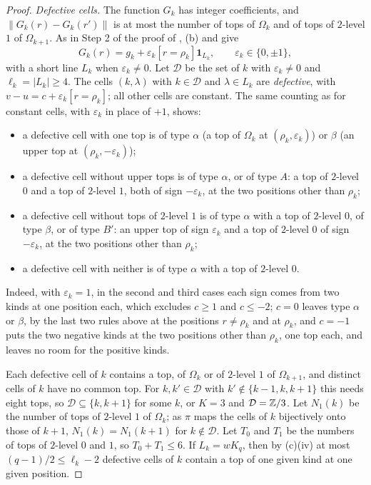 \begin{proof}
\emph{Defective cells.} The function $G_{k}$ has integer coefficients, and
$\|G_{k}(r)-G_{k}(r')\|$ is at most the number of tops of $\Omega_{k}$ and of
tops of $2$-level $1$ of $\Omega_{k+1}$. As in Step 2 of the proof of
, (b) and 
give
\[
  G_{k}(r)=g_{k}+\varepsilon_{k}[r=\rho_{k}]\mathbf 1_{L_{k}},\qquad
  \varepsilon_{k}\in\{0,\pm1\},
\]
with a short line $L_{k}$ when $\varepsilon_{k}\ne0$. Let $\mathcal D$ be the
set of $k$ with $\varepsilon_{k}\ne0$ and $\ell_{k}=|L_{k}|\ge4$. The cells
$(k,\lambda)$ with $k\in\mathcal D$ and $\lambda\in L_{k}$ are
\emph{defective}, with $v-u=c+\varepsilon_{k}[r=\rho_{k}]$; all other cells
are constant. The same counting as for constant cells, with $\varepsilon_{k}$
in place of $+1$, shows:
\begin{itemize}
\item a defective cell with one top is of type $\alpha$ (a top of $\Omega_{k}$
at $(\rho_{k},\varepsilon_{k})$) or $\beta$ (an upper top at
$(\rho_{k},-\varepsilon_{k})$);
\item a defective cell without upper tops is of type $\alpha$, or of type $A$:
a top of $2$-level $0$ and a top of $2$-level $1$, both of sign
$-\varepsilon_{k}$, at the two positions other than $\rho_{k}$;
\item a defective cell without tops of $2$-level $1$ is of type $\alpha$ with
a top of $2$-level $0$, of type $\beta$, or of type $B'$: an upper top of sign
$\varepsilon_{k}$ and a top of $2$-level $0$ of sign $-\varepsilon_{k}$, at
the two positions other than $\rho_{k}$;
\item a defective cell with neither is of type $\alpha$ with a top of
$2$-level $0$.
\end{itemize}
Indeed, with $\varepsilon_{k}=1$, in the second and third cases each sign
comes from two kinds at one position each, which excludes $c\ge1$ and
$c\le-2$; $c=0$ leaves type $\alpha$ or $\beta$, by the last two rules above
at the positions $r\ne\rho_{k}$ and at $\rho_{k}$, and $c=-1$ puts the two
negative kinds at the two positions other than $\rho_{k}$, one top each, and
leaves no room for the positive kinds.

Each defective cell of $k$ contains a top, of $\Omega_{k}$ or of $2$-level $1$
of $\Omega_{k+1}$, and distinct cells of $k$ have no common top. For
$k,k'\in\mathcal D$ with $k'\notin\{k-1,k,k+1\}$ this needs eight tops, so
$\mathcal D\subseteq\{k,k+1\}$ for some $k$, or $K=3$ and $\mathcal D=\mathbb{Z}/3$.
Let $N_{1}(k)$ be the number of tops of $2$-level $1$ of $\Omega_{k}$; as
$\pi$ maps the cells of $k$ bijectively onto those of $k+1$,
$N_{1}(k)=N_{1}(k+1)$ for $k\notin\mathcal D$. Let $T_{0}$ and $T_{1}$ be the
numbers of tops of $2$-level $0$ and $1$, so $T_{0}+T_{1}\le6$. If $L_{k}=wK_{q}$,
then by (c)(iv) at most $(q-1)/2\le\ell_{k}-2$
defective cells of $k$ contain a top of one given kind at one given
position.


\end{proof}
